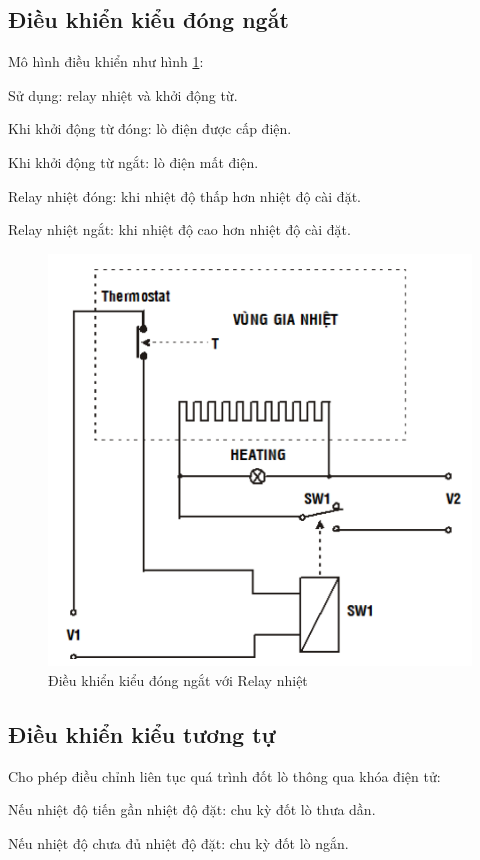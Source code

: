 \documentclass[13pt,a4paper]{extarticle}
\begin{document}
\subsection{Điều khiển kiểu đóng ngắt}
Mô hình điều khiển như hình \ref{Fig:relay-nhiet-on-off}:
\begin{list}{--}{}
\item Sử dụng: relay nhiệt và khởi động từ.
\item Khi khởi động từ đóng: lò điện được cấp điện.
\item Khi khởi động từ ngắt: lò điện mất điện.
\item Relay nhiệt đóng: khi nhiệt độ thấp hơn nhiệt độ cài đặt.
\item Relay nhiệt ngắt: khi nhiệt độ cao hơn nhiệt độ cài đặt. 
\end{list}
\begin{figure}[!h]
\begin{center}
\includegraphics[scale=.6]{1}
\end{center}
\caption{Điều khiển kiểu đóng ngắt với Relay nhiệt}
\label{Fig:relay-nhiet-on-off}
\end{figure}
\subsection{Điều khiển kiểu tương tự}
Cho phép điều chỉnh liên tục quá trình đốt lò thông qua khóa điện tử:
\begin{list}{--}{}
\item Nếu nhiệt độ tiến gần nhiệt độ đặt: chu kỳ đốt lò thưa dần.
\item Nếu nhiệt độ chưa đủ nhiệt độ đặt: chu kỳ đốt lò ngắn.
\end{list}
\end{document}

